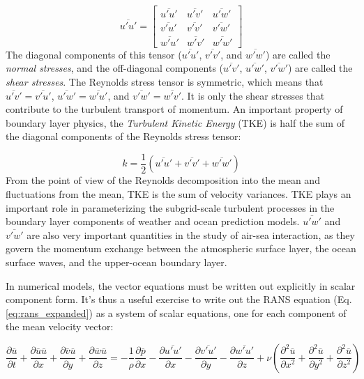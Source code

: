 \documentclass[12pt]{article}
\numberwithin{equation}{section}
\numberwithin{figure}{section}
\numberwithin{table}{section}
\begin{document}
\begin{equation}
  \overline{u'u'} = \begin{bmatrix}
    \overline{u'u'} & \overline{u'v'} & \overline{u'w'} \\
    \overline{v'u'} & \overline{v'v'} & \overline{v'w'} \\
    \overline{w'u'} & \overline{w'v'} & \overline{w'w'}
  \end{bmatrix}
\end{equation}
The diagonal components of this tensor ($\overline{u'u'}$, $\overline{v'v'}$, and
$\overline{w'w'}$) are called the \textit{normal stresses}, and the off-diagonal
components ($\overline{u'v'}$, $\overline{u'w'}$, $\overline{v'w'}$) are called
the \textit{shear stresses}.
The Reynolds stress tensor is symmetric, which means that
$\overline{u'v'} = \overline{v'u'}$, $\overline{u'w'} = \overline{w'u'}$, and
$\overline{v'w'} = \overline{w'v'}$.
It is only the shear stresses that contribute to the turbulent transport of
momentum.
An important property of boundary layer physics, the
\textit{Turbulent Kinetic Energy} (TKE) is half
the sum of the diagonal components of the Reynolds stress tensor:

\begin{equation}
  k = \frac{1}{2} \left( \overline{u'u'} + \overline{v'v'} + \overline{w'w'} \right)
\end{equation}
From the point of view of the Reynolds decomposition into the mean and
fluctuations from the mean, TKE is the sum of velocity variances.
TKE plays an important role in parameterizing the subgrid-scale turbulent
processes in the boundary layer components of weather and ocean prediction
models.
$\overline{u'w'}$ and $\overline{v'w'}$ are also very important quantities in
the study of air-sea interaction, as they govern the momentum exchange between
the atmospheric surface layer, the ocean surface waves, and the upper-ocean
boundary layer.

In numerical models, the vector equations must be written out explicitly in
scalar component form.
It's thus a useful exercise to write out the RANS equation
(Eq. \ref{eq:rans_expanded}) as a system of scalar equations, one for each
component of the mean velocity vector:

\begin{equation}
  \frac{\partial \overline{u}}{\partial t} + 
  \frac{\partial \overline{u} \overline{u}}{\partial x} +
  \frac{\partial \overline{v} \overline{u}}{\partial y} +
  \frac{\partial \overline{w} \overline{u}}{\partial z} =
  - \frac{1}{\rho} \frac{\partial \overline{p}}{\partial x}
  - \frac{\partial \overline{u'u'}}{\partial x} - \frac{\partial \overline{v'u'}}{\partial y} - \frac{\partial \overline{w'u'}}{\partial z}
  + \nu \left( \frac{\partial^2 \overline{u}}{\partial x^2} + 
               \frac{\partial^2 \overline{u}}{\partial y^2} +
               \frac{\partial^2 \overline{u}}{\partial z^2}
        \right)
\end{equation}
\end{document}
